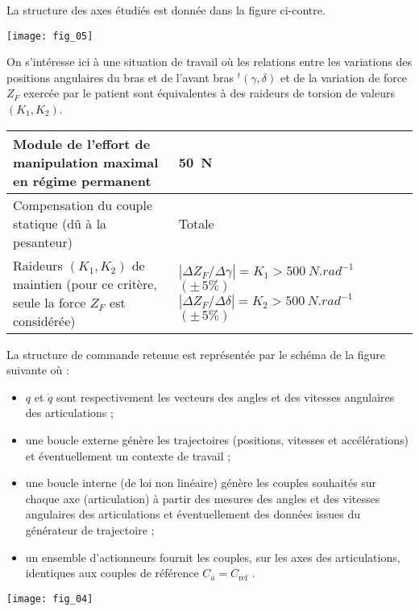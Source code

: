 La structure des axes étudiés est donnée dans la figure ci-contre.

\begin{marginfigure}
\texttt{[image: fig\_05]}
\end{marginfigure}



On s’intéresse ici à une situation de travail où les relations entre les variations des positions angulaires du
bras et de l’avant bras $ ^t(\gamma,\delta)$ et de la variation de force $Z_F$ exercée par le patient sont équivalentes à des raideurs de torsion de valeurs $(K_1,K_2)$.


\begin{center}
\begin{tabular}{|p{.45\linewidth}|p{.45\linewidth}|}
\hline
Module de l’effort de manipulation maximal en régime permanent & \SI{50}{N} \\
\hline
Compensation du couple statique (dû à la pesanteur) & Totale \\ \hline
Raideurs $(K_1,K_2)$ de maintien (pour ce critère, seule la force $Z_F$ est
considérée) & $\left | \Delta Z_F / \Delta \gamma \right | = K_1 > \SI{500}{N.rad^{-1}}$ $(\pm\,5\%)$ 
$\left | \Delta Z_F / \Delta \delta \right  | = K_2 > \SI{500}{N.rad^{-1}}$ $(\pm\,5\%)$ \\
\hline
\end{tabular}
\end{center}


La structure de commande retenue est représentée par le schéma de la figure suivante où :
\begin{itemize}
\item $q$ et $\dot{q}$ sont respectivement les vecteurs des angles et des vitesses angulaires des articulations ;
\item une boucle externe génère les trajectoires (positions, vitesses et accélérations) et éventuellement un contexte de travail ;
\item une boucle interne (de loi non linéaire) génère les couples souhaités sur chaque axe (articulation) à partir des mesures des angles et des vitesses angulaires des articulations et éventuellement des données issues du générateur de trajectoire ;
\item  un ensemble d’actionneurs fournit les couples, sur les axes des articulations, identiques aux couples de
référence $C_a = C_{\text{ref}}$ .
\end{itemize}

\begin{marginfigure}
\texttt{[image: fig\_04]}
\end{marginfigure}



